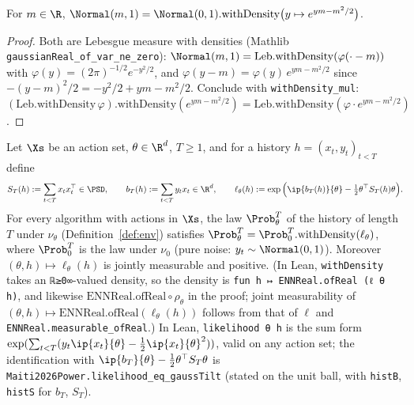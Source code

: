 \begin{lemma}\label{lem:pb_gaussian_density_ratio}
\leanok
For $m\in\R$, $\Normal(m,1) = \Normal(0,1).\mathrm{withDensity}\big(y\mapsto e^{ym-m^2/2}\big)$.
\end{lemma}

\begin{proof}
\leanok
Both are Lebesgue measure with densities (Mathlib \texttt{gaussianReal\_of\_var\_ne\_zero}):
$\Normal(m,1) = \mathrm{Leb}.\mathrm{withDensity}(\varphi(\cdot-m))$ with
$\varphi(y) = (2\pi)^{-1/2}e^{-y^2/2}$, and
$\varphi(y-m) = \varphi(y)\,e^{ym-m^2/2}$ since $-(y-m)^2/2 = -y^2/2+ym-m^2/2$. Conclude with
\texttt{withDensity\_mul}: $(\mathrm{Leb}.\mathrm{withDensity}\,\varphi).\mathrm{withDensity}(e^{ym-m^2/2}) = \mathrm{Leb}.\mathrm{withDensity}(\varphi\cdot e^{ym-m^2/2})$.
\end{proof}

\begin{corollary}\label{cor:pb_gaussian_likelihood}
\leanok
{}
Let $\Xs$ be an action set, $\theta\in\R^d$, $T\ge1$, and for a history $h = (x_t,y_t)_{t<T}$
define
\[
  S_T(h) := \sum_{t<T}x_tx_t^\top\in\PSD,\qquad b_T(h) := \sum_{t<T}y_tx_t\in\R^d,\qquad
  \ell_\theta(h) := \exp\Big(\ip{b_T(h)}{\theta}-\tfrac12\theta^\top S_T(h)\theta\Big) .
\]
For every algorithm with actions in $\Xs$, the law $\Prob_\theta^T$ of the history of length
$T$ under $\nu_\theta$ (Definition~\ref{def:env}) satisfies
$\Prob_\theta^T = \Prob_0^T.\mathrm{withDensity}(\ell_\theta)$, where $\Prob_0^T$ is the law
under $\nu_0$ (pure noise: $y_t\sim\Normal(0,1)$). Moreover $(\theta,h)\mapsto\ell_\theta(h)$ is
jointly measurable and positive. (In Lean, \texttt{withDensity} takes an
\texttt{ℝ≥0∞}-valued density, so the density is \texttt{fun h ↦ ENNReal.ofReal (ℓ θ h)}, and
likewise $\mathrm{ENNReal.ofReal}\circ\rho_\theta$ in the proof; joint measurability of
$(\theta,h)\mapsto\mathrm{ENNReal.ofReal}(\ell_\theta(h))$ follows from that of $\ell$ and
\texttt{ENNReal.measurable\_ofReal}.) In Lean, \texttt{likelihood θ h} is the sum form
$\exp(\sum_{t<T}(y_t\ip{x_t}{\theta} - \tfrac12\ip{x_t}{\theta}^2))$, valid on any action
set; the identification with $\ip{b_T}{\theta} - \tfrac12\theta^\top S_T\theta$ is
\texttt{Maiti2026Power.likelihood\_eq\_gaussTilt} (stated on the unit ball, with
\texttt{histB}, \texttt{histS} for $b_T$, $S_T$).
\end{corollary}

